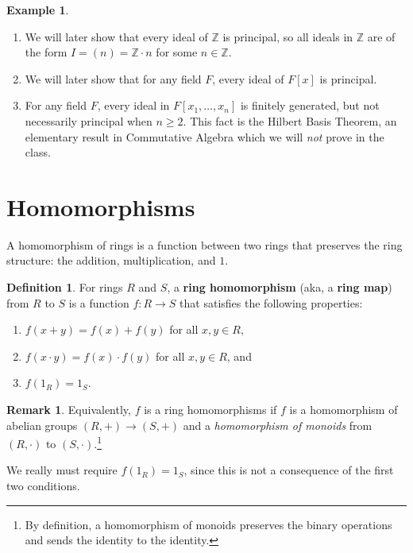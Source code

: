 \documentclass[12pt]{report}
\numberwithin{equation}{section}
\numberwithin{theorem}{chapter}
\theoremstyle{definition}
\newtheorem{definition}[theorem]{Definition}
\newtheorem{example}[theorem]{Example}
\newtheorem*{basic properties}{Basic Properties}
\newtheorem*{Important Remark}{Important Remark}
\newtheorem{remark}[theorem]{Remark}
\newcommand{\df}[1]{{\bf #1}\index{#1}}
\newcommand{\Z}{\mathbb{Z}}
\begin{document}
\begin{example}$\,$
\begin{enumerate}[itemsep=-0.1em]
\item We will later show that every ideal of $\Z$ is principal, so all ideals in $\Z$ are of the form $I=(n) = \Z \cdot n$ for some $n\in \Z$.
\item We will later show that for any field $F$, every ideal of $F[x]$ is principal.
\item  For any field $F$, every ideal in $F[x_1,\ldots,x_n]$ is finitely generated, but not necessarily principal when $n \geqslant 2$.  This fact is the Hilbert Basis Theorem, an elementary result in Commutative Algebra which we will \emph{not} prove in the class. 
\end{enumerate}
\end{example}




\section{Homomorphisms}


A homomorphism of rings is a function between two rings that preserves the ring structure: the addition, multiplication, and $1$.

\begin{definition} 
For rings $R$ and $S$, a \df{ring homomorphism} (aka, a \df{ring map}) from $R$ to $S$ is a function $f\!: R \to S$ that satisfies the following properties:
\begin{enumerate}[itemsep=0.1em]
\vspace{-0.3em}
\item $f(x + y) = f(x) + f(y)$ for all $x,y \in R$,
\item $f(x \cdot y) = f(x) \cdot f(y)$ for all $x,y \in R$, and
\item $f(1_R) = 1_S$. 
\end{enumerate}	
\end{definition}

\begin{remark} 
Equivalently, $f$ is a ring homomorphisms if $f$ is a homomorphism of abelian groups $(R, +) \longrightarrow (S,+)$ and a {\em homomorphism of monoids} from
  $(R, \cdot)$ to $(S, \cdot)$.\footnote{By definition, a homomorphism of monoids preserves the binary operations and sends the identity to the identity.}
\end{remark}


We really must require $f(1_R) = 1_S$, since this is not a consequence of the first two conditions.
  
\end{document}
